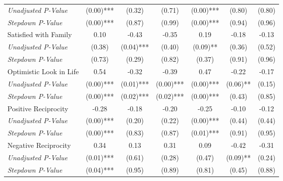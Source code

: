 \begin{tabular}{l c c c c c c}
\quad \textit{Unadjusted P-Value} & (0.00)*** & (0.32) & (0.71) & (0.00)*** & (0.80) & (0.80) \\
\quad \textit{Stepdown P-Value} & (0.00)*** & (0.87) & (0.99) & (0.00)*** & (0.94) & (0.96) \\
Satisfied with Family & 0.10 & -0.43 & -0.35 & 0.19 & -0.18 & -0.13 \\
\quad \textit{Unadjusted P-Value} & (0.38) & (0.04)*** & (0.40) & (0.09)** & (0.36) & (0.52) \\
\quad \textit{Stepdown P-Value} & (0.73) & (0.29) & (0.82) & (0.37) & (0.91) & (0.96) \\
Optimistic Look in Life & 0.54 & -0.32 & -0.39 & 0.47 & -0.22 & -0.17 \\
\quad \textit{Unadjusted P-Value} & (0.00)*** & (0.01)*** & (0.00)*** & (0.00)*** & (0.06)** & (0.15) \\
\quad \textit{Stepdown P-Value} & (0.00)*** & (0.02)*** & (0.02)*** & (0.00)*** & (0.43) & (0.85) \\
Positive Reciprocity & -0.28 & -0.18 & -0.20 & -0.25 & -0.10 & -0.12 \\
\quad \textit{Unadjusted P-Value} & (0.00)*** & (0.20) & (0.22) & (0.00)*** & (0.44) & (0.44) \\
\quad \textit{Stepdown P-Value} & (0.00)*** & (0.83) & (0.87) & (0.01)*** & (0.91) & (0.95) \\
Negative Reciprocity & 0.34 & 0.13 & 0.31 & 0.09 & -0.42 & -0.31 \\
\quad \textit{Unadjusted P-Value} & (0.01)*** & (0.61) & (0.28) & (0.47) & (0.09)** & (0.24) \\
\quad \textit{Stepdown P-Value} & (0.04)*** & (0.95) & (0.89) & (0.81) & (0.45) & (0.88) \\
\bottomrule
\end{tabular}
